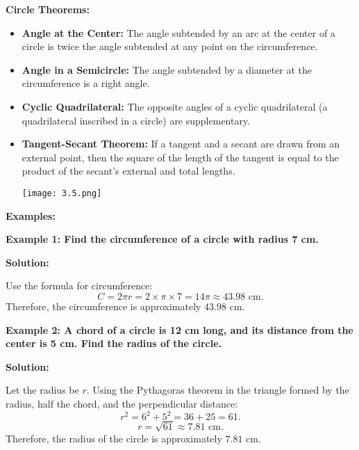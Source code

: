 \textbf{Circle Theorems:}
\begin{itemize}
	\item \textbf{Angle at the Center:} The angle subtended by an arc at the center of a circle is twice the angle subtended at any point on the circumference.
	\item \textbf{Angle in a Semicircle:} The angle subtended by a diameter at the circumference is a right angle.
	\item \textbf{Cyclic Quadrilateral:} The opposite angles of a cyclic quadrilateral (a quadrilateral inscribed in a circle) are supplementary.
	\item \textbf{Tangent-Secant Theorem:} If a tangent and a secant are drawn from an external point, then the square of the length of the tangent is equal to the product of the secant's external and total lengths.
	
	\begin{center}
		\texttt{[image: 3.5.png]}
	\end{center}
\end{itemize}

\textbf{Examples:}

\begin{flushleft}
	\textbf{Example 1: Find the circumference of a circle with radius 7 cm.}
	
	\vspace{0.5cm}
	\textbf{Solution:}
	\vspace{0.5cm}
	
	Use the formula for circumference:
	\[
	C = 2\pi r = 2 \times \pi \times 7 = 14\pi \approx 43.98 \text{ cm}.
	\]
	Therefore, the circumference is approximately $43.98$ cm.
\end{flushleft}

\begin{flushleft}
	\textbf{Example 2: A chord of a circle is 12 cm long, and its distance from the center is 5 cm. Find the radius of the circle.}
	
	\vspace{0.5cm}
	\textbf{Solution:}
	\vspace{0.5cm}
	
	Let the radius be $r$. Using the Pythagoras theorem in the triangle formed by the radius, half the chord, and the perpendicular distance:
	\[
	r^2 = 6^2 + 5^2 = 36 + 25 = 61.
	\]
	\[
	r = \sqrt{61} \approx 7.81 \text{ cm}.
	\]
	Therefore, the radius of the circle is approximately $7.81$ cm.
\end{flushleft}


